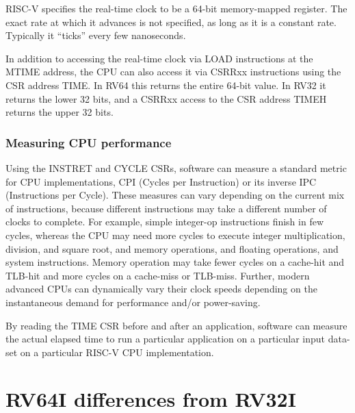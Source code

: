 RISC-V specifies the real-time clock to be a 64-bit memory-mapped
register.  The exact rate at which it advances is not specified, as
long as it is a constant rate.  Typically it ``ticks'' every few
nanoseconds.

In addition to accessing the real-time clock via LOAD instructions at
the MTIME address, the CPU can also access it via CSRRxx instructions
using the CSR address TIME.  In RV64 this returns the entire 64-bit
value.  In RV32 it returns the lower 32 bits, and a CSRRxx access to
the CSR address TIMEH returns the upper 32 bits.


\subsubsection{Measuring CPU performance}

\label{Sec_CPU_Performance}


Using the INSTRET and CYCLE CSRs, software can measure a standard
metric for CPU implementations, CPI (Cycles per Instruction) or its
inverse IPC (Instructions per Cycle).  These measures can vary
depending on the current mix of instructions, because different
instructions may take a different number of clocks to complete.  For
example, simple integer-op instructions finish in few cycles, whereas
the CPU may need more cycles to execute integer multiplication,
division, and square root, and memory operations, and floating
operations, and system instructions.  Memory operation may take fewer
cycles on a cache-hit and TLB-hit and more cycles on a cache-miss or
TLB-miss.  Further, modern advanced CPUs can dynamically vary their
clock speeds depending on the instantaneous demand for performance
and/or power-saving.

By reading the TIME CSR before and after an application, software can
measure the actual elapsed time to run a particular application on a
particular input data-set on a particular RISC-V CPU implementation.


\section{RV64I differences from RV32I}

